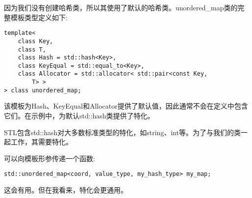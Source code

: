 因为我们没有创建哈希类，所以其使用了默认的哈希类。unordered\_map类的完整模板类型定义如下:

\begin{lstlisting}[style=styleCXX]
template<
	class Key,
	class T,
	class Hash = std::hash<Key>,
	class KeyEqual = std::equal_to<Key>,
	class Allocator = std::allocator< std::pair<const Key,
		T> >
> class unordered_map;
\end{lstlisting}

该模板为Hash、KeyEqual和Allocator提供了默认值，因此通常不会在定义中包含它们。在示例中，为默认std::hash类提供了特化。

STL包含std::hash对大多数标准类型的特化，如string、int等。为了与我们的类一起工作，其需要特化。

可以向模板形参传递一个函数:

\begin{lstlisting}[style=styleCXX]
std::unordered_map<coord, value_type, my_hash_type> my_map;
\end{lstlisting}

这会有用。但在我看来，特化会更通用。





